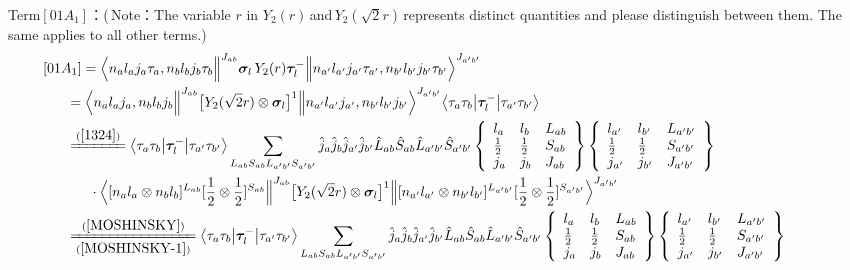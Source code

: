 \documentclass[master]{shnuthesis}
\newcommand{\ap}{a^\prime}
\newcommand{\bp}{b^\prime}
\newcommand{\il}{\!\!\!\!\!\!\!\!\!\!}
\newcommand{\ii}{\!\!\!\!\!\!\!\!\!\!\!\!\!\!\!\!\!\!\!\!}
\newcommand{\zdydh}{\xlongequal}
\begin{document}
{\color{red}Term$[01A_1]$：}(\,Note：The variable $r$ in $Y_2(r)$\,and\,$Y_2(\sqrt{2}r)$\,represents distinct quantities and please distinguish between them. The same applies to all other terms.)
\begin{align}
    &\ii [01A_1] = \Big\langle n_a l_a j_a \tau_a, n_b l_b j_b \tau_b \Big\|^{J_{ab}} \bm{\sigma}_l\, Y_2(r) \bm{\tau}_l^- \Big\| n_{\ap} l_{\ap} j_{\ap} \tau_{\ap}, n_{\bp} l_{\bp} j_{\bp} \tau_{\bp} \Big\rangle^{J_{\ap \bp}} \\
    &\il = \Big\langle n_a l_a j_a, n_b l_b j_b \Big\|^{J_{ab}} \big[Y_2(\sqrt{2}r) \otimes \bm{\sigma}_l\big]^1 \Big\| n_{\ap} l_{\ap} j_{\ap}, n_{\bp} l_{\bp} j_{\bp} \Big\rangle^{J_{\ap \bp}} \big\langle \tau_a\tau_b \big|\bm{\tau}_l^- \big|\tau_{\ap}\tau_{\bp}\big\rangle \\
    &\il \xlongequal{(\ref{1324})} \big\langle \tau_a\tau_b \big|\bm{\tau}_l^- \big|\tau_{\ap}\tau_{\bp}\big\rangle \sum_{L_{ab}S_{ab}L_{\ap\bp}S_{\ap\bp}} \hat{j}_a\hat{j}_b\hat{j}_{\ap}\hat{j}_{\bp}\hat{L}_{ab}\hat{S}_{ab}\hat{L}_{\ap\bp}\hat{S}_{\ap\bp}  \left\{\begin{array}{lll}l_{a} & l_{b} & L_{ab} \\ \frac{1}{2} & \frac{1}{2} & S_{ab} \\j_{a} & j_{b} & J_{ab} \end{array}\right\}  \left\{\begin{array}{lll}l_{\ap} & l_{\bp} & L_{\ap\bp} \\ \frac{1}{2} & \frac{1}{2} & S_{\ap\bp} \\j_{\ap} & j_{\bp} & J_{\ap\bp} \end{array}\right\}  \notag \\
    & \cdot \Big\langle [n_a l_a \otimes n_b l_b]^{L_{ab}} [\frac{1}{2}\otimes\frac{1}{2}]^{S_{ab}} \Big\|^{J_{ab}} \big[Y_2(\sqrt{2}r) \otimes \bm{\sigma}_l\big]^1 \Big\| [n_{\ap} l_{\ap} \otimes n_{\bp} l_{\bp}]^{L_{\ap\bp}} [\frac{1}{2}\otimes\frac{1}{2}]^{S_{\ap\bp}} \Big\rangle^{J_{\ap \bp}} \\
    &\il \zdydh[(\ref{MOSHINSKY-1})]{(\ref{MOSHINSKY})} \big\langle \tau_a\tau_b \big|\bm{\tau}_l^- \big|\tau_{\ap}\tau_{\bp}\big\rangle \sum_{L_{ab}S_{ab}L_{\ap\bp}S_{\ap\bp}} \hat{j}_a\hat{j}_b\hat{j}_{\ap}\hat{j}_{\bp}\hat{L}_{ab}\hat{S}_{ab}\hat{L}_{\ap\bp}\hat{S}_{\ap\bp}  \left\{\begin{array}{lll}l_{a} & l_{b} & L_{ab} \\ \frac{1}{2} & \frac{1}{2} & S_{ab} \\j_{a} & j_{b} & J_{ab} \end{array}\right\} \left\{\begin{array}{lll}l_{\ap} & l_{\bp} & L_{\ap\bp} \\ \frac{1}{2} & \frac{1}{2} & S_{\ap\bp} \\j_{\ap} & j_{\bp} & J_{\ap\bp} \end{array}\right\}  \notag \\

\end{align}
\end{document}
